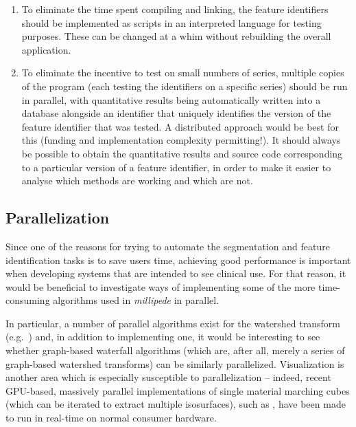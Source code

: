 \begin{itemize}
\begin{enumerate}
\item To eliminate the time spent compiling and linking, the feature identifiers should be implemented as scripts in an interpreted language for testing purposes. These can be changed at a whim without rebuilding the overall application.

\item To eliminate the incentive to test on small numbers of series, multiple copies of the program (each testing the identifiers on a specific series) should be run in parallel, with quantitative results being automatically written into a database alongside an identifier that uniquely identifies the version of the feature identifier that was tested. A distributed approach would be best for this (funding and implementation complexity permitting!). It should always be possible to obtain the quantitative results and source code corresponding to a particular version of a feature identifier, in order to make it easier to analyse which methods are working and which are not.

\end{enumerate}

\end{itemize}

\subsection{Parallelization}

Since one of the reasons for trying to automate the segmentation and feature identification tasks is to save users time, achieving good performance is important when developing systems that are intended to see clinical use. For that reason, it would be beneficial to investigate ways of implementing some of the more time-consuming algorithms used in \emph{millipede} in parallel.

In particular, a number of parallel algorithms exist for the watershed transform (e.g.~\cite{bieniek97,moga98}) and, in addition to implementing one, it would be interesting to see whether graph-based waterfall algorithms (which are, after all, merely a series of graph-based watershed transforms) can be similarly parallelized. Visualization is another area which is especially susceptible to parallelization -- indeed, recent GPU-based, massively parallel implementations of single material marching cubes (which can be iterated to extract multiple isosurfaces), such as \cite{dyken08}, have been made to run in real-time on normal consumer hardware.

